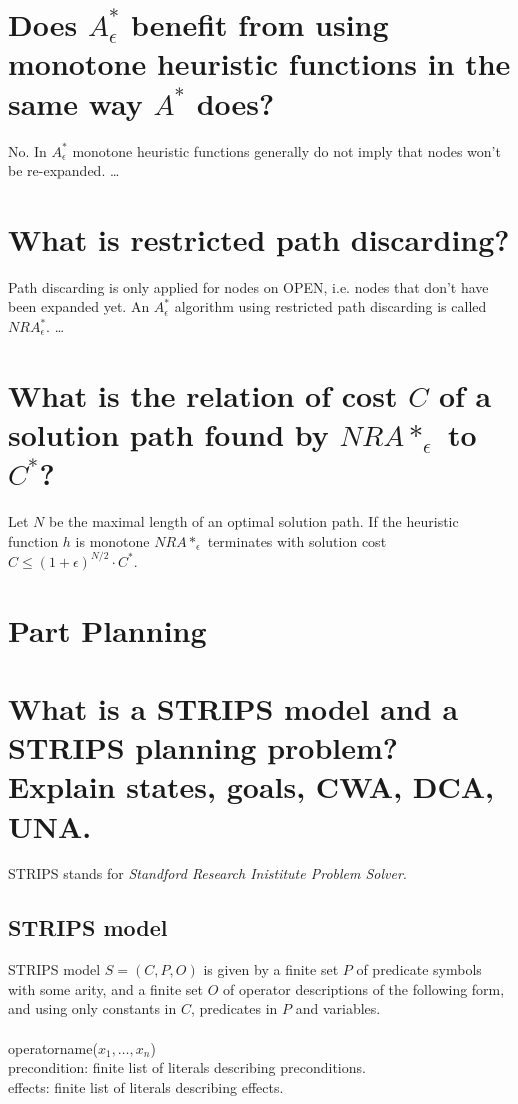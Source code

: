 \documentclass[12pt, a4paper]{article}
\begin{document}
\section{Does $A^*_\epsilon$ benefit from using monotone heuristic functions in the same way $A^*$ does?}
No. In $A^*_\epsilon$ monotone heuristic functions generally do not imply that nodes won't be re-expanded. \ldots

\section{What is restricted path discarding?}
Path discarding is only applied for nodes on OPEN, i.e. nodes that don't have been expanded yet. An $A^*_\epsilon$ algorithm using restricted path discarding is called $NRA^*_\epsilon$.
\ldots 

\section{What is the relation of cost $C$ of a solution path found by $NRA*_{\epsilon}$ to $C^*$?}
Let $N$ be the maximal length of an optimal solution path. If the heuristic function $h$ is monotone $NRA*_\epsilon$ terminates with solution cost \\
$C \leq (1 + \epsilon)^{N/2} \cdot C^*$.\\

\section*{{\huge Part Planning}}

\section{What is a STRIPS model and a STRIPS planning problem? Explain states, goals, CWA, DCA, UNA.}
STRIPS stands for \textit{Standford Research Inistitute Problem Solver}.
\subsection*{STRIPS model}
STRIPS model $ S = (C, P, O)$ is given by a finite set $P$ of predicate symbols with some arity, and a finite set $O$ of operator descriptions of the following form, and using only constants in $C$, predicates in $P$ and variables. \\ \\
operatorname($ x_1, \ldots,  x_n $) \\
precondition: finite list of literals describing preconditions. \\
effects: finite list of literals describing effects. 
\end{document}
